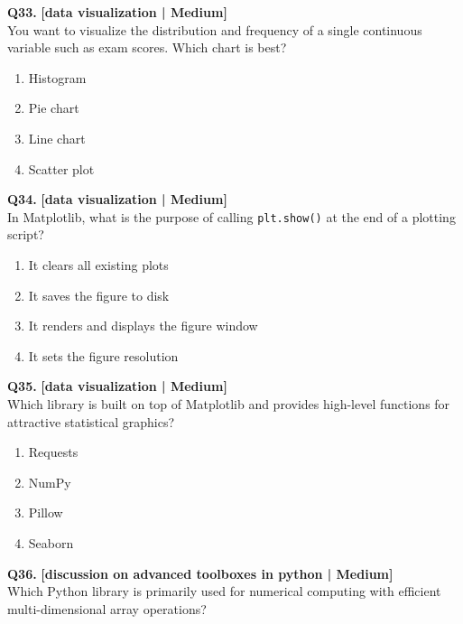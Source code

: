 \noindent\textbf{Q33.} \hfill {\small\color{LPUOrange}\textbf{[data visualization | Medium]}}\\[2pt]
You want to visualize the distribution and frequency of a single continuous variable such as exam scores. Which chart is best?

\begin{enumerate}[label=(\alph*),topsep=2pt,itemsep=1pt,partopsep=0pt,parsep=0pt]
    \item \relax Histogram
    \item \relax Pie chart
    \item \relax Line chart
    \item \relax Scatter plot
\end{enumerate}
\vspace{2mm}

\noindent\textbf{Q34.} \hfill {\small\color{LPUOrange}\textbf{[data visualization | Medium]}}\\[2pt]
In Matplotlib, what is the purpose of calling \texttt{plt.show()} at the end of a plotting script?

\begin{enumerate}[label=(\alph*),topsep=2pt,itemsep=1pt,partopsep=0pt,parsep=0pt]
    \item \relax It clears all existing plots
    \item \relax It saves the figure to disk
    \item \relax It renders and displays the figure window
    \item \relax It sets the figure resolution
\end{enumerate}
\vspace{2mm}

\noindent\textbf{Q35.} \hfill {\small\color{LPUOrange}\textbf{[data visualization | Medium]}}\\[2pt]
Which library is built on top of Matplotlib and provides high-level functions for attractive statistical graphics?

\begin{enumerate}[label=(\alph*),topsep=2pt,itemsep=1pt,partopsep=0pt,parsep=0pt]
    \item \relax Requests
    \item \relax NumPy
    \item \relax Pillow
    \item \relax Seaborn
\end{enumerate}
\vspace{2mm}

\noindent\textbf{Q36.} \hfill {\small\color{LPUOrange}\textbf{[discussion on advanced toolboxes in python | Medium]}}\\[2pt]
Which Python library is primarily used for numerical computing with efficient multi-dimensional array operations?

